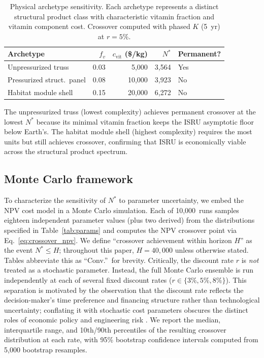 \documentclass[preprint,12pt]{elsarticle}
\begin{document}
\begin{table}[htbp]
\centering
\caption{Physical archetype sensitivity. Each archetype represents a distinct structural product class with characteristic vitamin fraction and vitamin component cost. Crossover computed with phased $K$ (5~yr) at $r = 5\%$.}
\label{tab:archetype_fv}
\small
\begin{tabular}{@{}lrrrl@{}}
\toprule
Archetype & $f_v$ & $c_{\mathrm{vit}}$ (\$/kg) & $N^*$ & Permanent? \\
\midrule
Unpressurized truss      & 0.03 &  5{,}000 & 3{,}564 & Yes \\
Pressurized struct.\ panel & 0.08 & 10{,}000 & 3{,}923 & No \\
Habitat module shell      & 0.15 & 20{,}000 & 6{,}272 & No \\
\bottomrule
\end{tabular}
\end{table}

The unpressurized truss (lowest complexity) achieves permanent crossover at the lowest $N^*$ because its minimal vitamin fraction keeps the ISRU asymptotic floor below Earth's. The habitat module shell (highest complexity) requires the most units but still achieves crossover, confirming that ISRU is economically viable across the structural product spectrum.

\subsection{Monte Carlo framework}

To characterize the sensitivity of $N^*$ to parameter uncertainty, we embed the NPV cost model in a Monte Carlo simulation. Each of 10{,}000~runs samples eighteen independent parameter values (plus two derived) from the distributions specified in Table~\ref{tab:params} and computes the NPV crossover point via Eq.~\ref{eq:crossover_npv}. We define ``crossover achievement within horizon $H$'' as the event $N^* \leq H$; throughout this paper, $H = 40{,}000$ unless otherwise stated. Tables abbreviate this as ``Conv.''\ for brevity. Critically, the discount rate $r$ is \emph{not} treated as a stochastic parameter. Instead, the full Monte Carlo ensemble is run independently at each of several fixed discount rates ($r \in \{3\%, 5\%, 8\%\}$). This separation is motivated by the observation that the discount rate reflects the decision-maker's time preference and financing structure rather than technological uncertainty; conflating it with stochastic cost parameters obscures the distinct roles of economic policy and engineering risk \cite{arrow2014}. We report the median, interquartile range, and 10th/90th percentiles of the resulting crossover distribution at each rate, with 95\% bootstrap confidence intervals computed from 5{,}000 bootstrap resamples.
\end{document}
